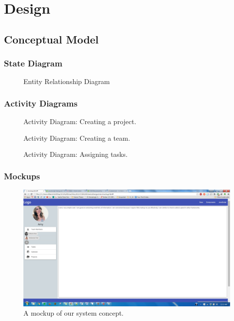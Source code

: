 \chapter{Design}

\section{Conceptual Model}

\subsection{State Diagram}
\begin{figure}[ht]
\centering
{}
\caption{Entity Relationship Diagram}
\end{figure}
\FloatBarrier

\subsection{Activity Diagrams}

\begin{figure}[ht]
\centering
{}
\caption{Activity Diagram: Creating a project.}
\end{figure}


\begin{figure}[ht]
\centering
{}
\caption{Activity Diagram: Creating a team.}
\end{figure}


\begin{figure}[ht]
\centering
{}
\caption{Activity Diagram: Assigning tasks.}
\end{figure}
\FloatBarrier

\subsection{Mockups}

\begin{figure}[ht]
\includegraphics[width=\textwidth]{mockup.jpg}
\caption{A mockup of our system concept.}
\end{figure}
\FloatBarrier


